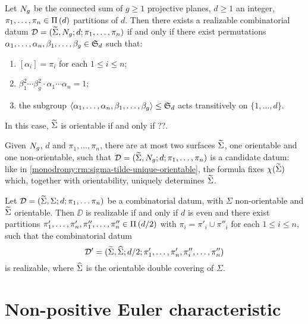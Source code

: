\begin{proposition}\label{monodromy:th:monodromy-realizability-non-orientable}
Let $N_{g}$ be the connected sum of $g\ge 1$ projective planes, $d\ge 1$ an integer, $\pi_1,\ldots,\pi_n\in\Pi\left(d\right)$ partitions of $d$. Then there exists a realizable combinatorial datum $\mathcal{D}=(\widetilde{\Sigma},N_{g};d;\pi_1,\ldots,\pi_n)$ if and only if there exist permutations $\alpha_1,\ldots,\alpha_n,\beta_1,\ldots,\beta_g\in\symgroup[d]$ such that:
\begin{enumerate}
\item $[\alpha_i]=\pi_i$ for each $1\le i\le n$;
\item $\beta_1^2\cdots\beta_g^2\cdot\alpha_1\cdots\alpha_n=1$;
\item the subgroup $\angled{\alpha_1,\ldots,\alpha_n,\beta_1,\ldots,\beta_g}\subgroup\symgroup[d]$ acts transitively on $\{1,\ldots,d\}$.
\end{enumerate}
In this case, $\widetilde{\Sigma}$ is orientable if and only if ??.
\end{proposition}
\begin{remark}\label{monodromy:rm:sigma-tilde-unique-non-orientable}
Given $N_{g}$, $d$ and $\pi_1,\ldots,\pi_n$, there are at most two surfaces $\widetilde{\Sigma}$, one orientable and one non-orientable, such that $\mathcal{D}=(\widetilde{\Sigma},N_{g};d;\pi_1,\ldots,\pi_n)$ is a candidate datum: like in \cref{monodromy:rm:sigma-tilde-unique-orientable}, the \RH{} formula fixes $\chi(\widetilde{\Sigma})$ which, together with orientability, uniquely determines $\widetilde{\Sigma}$.
\end{remark}

\begin{proposition}\label{monodromy:th:monodromy-realizability-double-covering}
Let $\mathcal{D}=(\widetilde{\Sigma},\Sigma;d;\pi_1,\ldots\pi_n)$ be a combinatorial datum, with $\Sigma$ non-orientable and $\widetilde{\Sigma}$ orientable. Then $\DD$ is realizable if and only if $d$ is even and there exist partitions $\pi'_1,\ldots,\pi'_n,\pi''_1,\ldots,\pi''_n\in\Pi\left(d/2\right)$ with $\pi_i=\pi'_i\cup\pi''_i$ for each $1\le i\le n$, such that the combinatorial datum
\[
\mathcal{D}'=(\widetilde{\Sigma},\widehat{\Sigma};d/2;\pi'_1,\ldots,\pi'_n,\pi''_i,\ldots,\pi''_n)
\]
is realizable, where $\widehat{\Sigma}$ is the orientable double covering of $\Sigma$.
\end{proposition}

\section{Non-positive Euler characteristic}

